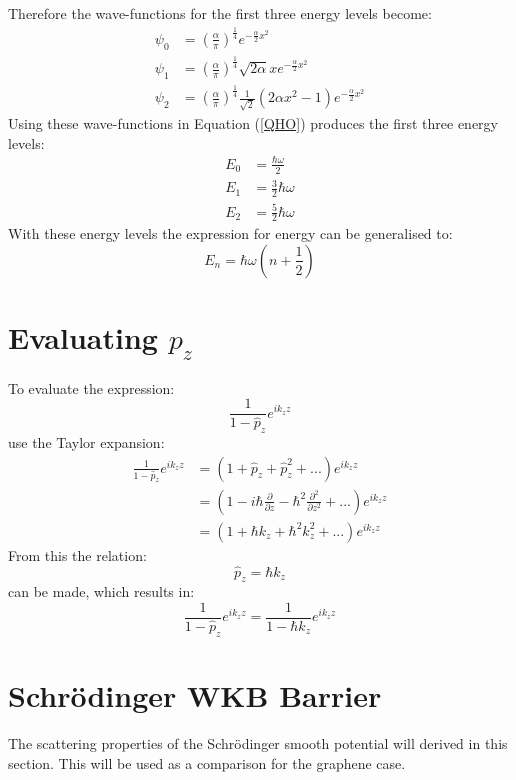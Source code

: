 		Therefore the wave-functions for the first three energy levels become:
		\begin{align}
			\psi_{0}&=\left(\frac{\alpha}{\pi}\right)^{\frac{1}{4}}e^{-\frac{\alpha}{2}x^{2}}\\
			\psi_{1}&=\left(\frac{\alpha}{\pi}\right)^{\frac{1}{4}}\sqrt{2\alpha}xe^{-\frac{\alpha}{2}x^{2}}\\
			\psi_{2}&=\left(\frac{\alpha}{\pi}\right)^{\frac{1}{4}}\frac{1}{\sqrt{2}}\left(2\alpha x^2-1\right)e^{-\frac{\alpha}{2}x^{2}}
		\end{align}
		Using these wave-functions in Equation (\ref{QHO}) produces the first three energy levels:
		\begin{align}
			E_{0}&=\frac{\hbar\omega}{2}\\
			E_{1}&=\frac{3}{2}\hbar\omega\\
			E_{2}&=\frac{5}{2}\hbar\omega
		\end{align}
		With these energy levels the expression for energy can be generalised to:
		\begin{equation}
			E_{n}=\hbar\omega\left(n+\frac{1}{2}\right)
		\end{equation}
	\section{Evaluating $p_{z}$}
	\label{Appendix - pz}
		To evaluate the expression:
		\begin{equation}
			\frac{1}{1-\hat{p}_{z}}e^{ik_{z}z}
		\end{equation}
		use the Taylor expansion:
		\begin{align}
			\frac{1}{1-\hat{p}_{z}}e^{ik_{z}z}&=\left(1+\hat{p}_{z}+\hat{p}_{z}^{2}+...\right)e^{ik_{z}z}\\
			&=\left(1-i\hbar\frac{\partial}{\partial z}-\hbar^{2}\frac{\partial^{2}}{\partial z^{2}}+...\right)e^{ik_{z}z}\\
			&=\left(1+\hbar k_{z}+\hbar^{2}k_{z}^{2}+...\right)e^{ik_{z}z}
		\end{align}
		From this the relation:
		\begin{equation}
			\hat{p}_{z}=\hbar k_{z}
		\end{equation}
		can be made, which results in:
		\begin{equation}
			\frac{1}{1-\hat{p}_{z}}e^{ik_{z}z}=\frac{1}{1-\hbar k_{z}}e^{ik_{z}z}
		\end{equation}
	\section{Schr{\" o}dinger WKB Barrier}
	\label{Appendix - Schrodinger WKB Barrier}
		The scattering properties of the Schr{\" o}dinger smooth potential will derived in this section. This will be used as a comparison for the graphene case.
